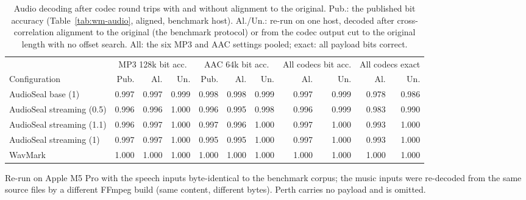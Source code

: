 \begin{table}[!t]
\centering
\footnotesize
\caption{Audio decoding after codec round trips with and without alignment to the original. Pub.: the published bit accuracy (Table~\ref{tab:wm-audio}, aligned, benchmark host). Al./Un.: re-run on one host, decoded after cross-correlation alignment to the original (the benchmark protocol) or from the codec output cut to the original length with no offset search. All: the six MP3 and AAC settings pooled; exact: all payload bits correct.}
\label{tab:wm-noalign}
\setlength{\tabcolsep}{3.4pt}
\begin{tabular}{lrrrrrrrrrr}
\toprule
 & \multicolumn{3}{c}{MP3 128k bit acc.} & \multicolumn{3}{c}{AAC 64k bit acc.} & \multicolumn{2}{c}{All codecs bit acc.} & \multicolumn{2}{c}{All codecs exact} \\
Configuration & Pub. & Al. & Un. & Pub. & Al. & Un. & Al. & Un. & Al. & Un. \\
\midrule
AudioSeal base (1) & 0.997 & 0.997 & 0.999 & 0.998 & 0.998 & 0.999 & 0.997 & 0.999 & 0.978 & 0.986 \\
AudioSeal streaming (0.5) & 0.996 & 0.996 & 1.000 & 0.996 & 0.995 & 0.998 & 0.996 & 0.999 & 0.983 & 0.990 \\
AudioSeal streaming (1.1) & 0.996 & 0.997 & 1.000 & 0.997 & 0.996 & 1.000 & 0.997 & 1.000 & 0.993 & 1.000 \\
AudioSeal streaming (1) & 0.997 & 0.997 & 1.000 & 0.995 & 0.995 & 1.000 & 0.997 & 1.000 & 0.993 & 1.000 \\
WavMark & 1.000 & 1.000 & 1.000 & 1.000 & 1.000 & 1.000 & 1.000 & 1.000 & 1.000 & 1.000 \\
\bottomrule
\end{tabular}
\par\vspace{2pt}\parbox{\linewidth}{\raggedright\scriptsize Re-run on Apple M5 Pro with the speech inputs byte-identical to the benchmark corpus; the music inputs were re-decoded from the same source files by a different FFmpeg build (same content, different bytes). Perth carries no payload and is omitted.}
\end{table}
